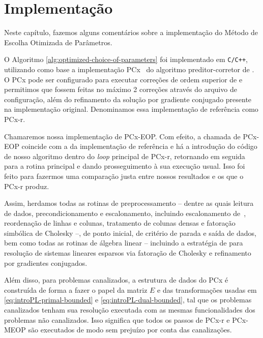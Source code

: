 

\chapter{Implementação}
\label{chap:implementa}
Neste capítulo, fazemos alguns comentários sobre a implementação do Método de Escolha Otimizada de Parâmetros. 


O Algoritmo \ref{alg:optimized-choice-of-parameters} foi implementado em  \texttt{C/C++}, utilizando como base a implementação PCx~\cite{Czyzyk:1999hk} do algoritmo preditor-corretor de \textcite{Mehrotra:1992wr}. O PCx pode ser configurado para executar correções de ordem superior de \textcite{Gondzio:1996uw} e permitimos que fossem feitas no máximo 2 correções através do arquivo de configuração, além do  refinamento da solução por gradiente conjugado presente na implementação original. Denominamos essa implementação de referência como PCx-r.

  Chamaremos nossa implementação de PCx-EOP. Com efeito, a chamada de PCx-EOP coincide com a da implementação de referência e há a introdução do código de nosso algoritmo dentro do \emph{loop} principal de PCx-r,  retornando em seguida para a rotina principal e dando prosseguimento à sua execução usual. Isso foi feito para fazermos uma comparação justa entre nossos resultados e os que o PCx-r produz. 

  Assim, herdamos todas as rotinas de preprocessamento -- dentre as quais leitura de dados, precondicionamento e escalonamento, incluindo escalonamento de~\textcite{Curtis:1972cp}, reordenação de linhas e colunas, tratamento de colunas densas e fatoração simbólica de Cholesky --, de ponto inicial, de critério de parada e saída de dados,   bem como todas as rotinas de álgebra linear -- incluindo a estratégia  de \textcite{Ng:1993uz} para resolução de sistemas lineares esparsos via fatoração de Cholesky  e refinamento por gradientes conjugados. 


  Além disso, para problemas canalizados, a estrutura de dados do PCx é construída de forma a fazer o papel da matriz $E$ e das transformações usadas em \eqref{eq:introPL-primal-bounded} e \eqref{eq:introPL-dual-bounded}, tal que os problemas canalizados tenham sua resolução executada com  as mesmas funcionalidades dos problemas não canalizados. Isso significa que todos os passos de  PCx-r e PCx-MEOP são executados de modo sem prejuízo por conta das canalizações.



